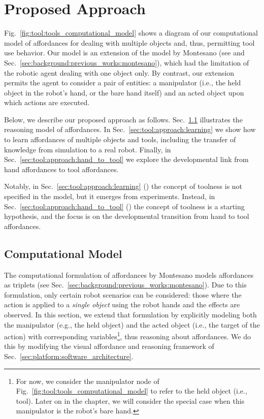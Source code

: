\section{Proposed Approach}
\label{sec:tool:approach}

Fig.~\ref{fig:tool:tools_computational_model} shows a diagram of our computational model of affordances for dealing with multiple objects and, thus, permitting tool use behavior.
Our model is an extension of the model by Montesano (see \cite{montesano:2008} and Sec.~\ref{sec:background:previous_works:montesano}), which had the limitation of the robotic agent dealing with one object only.
By contrast, our extension permits the agent to consider a pair of entities: a manipulator (i.e., the held object in the robot's hand, or the bare hand itself) and an acted object upon which actions are executed.

Below, we describe our proposed approach as follows.
Sec.~\ref{sec:tool:approach:model} illustrates the reasoning model of \intobj{} affordances.
In Sec.~\ref{sec:tool:approach:learning} we show how to learn affordances of multiple objects and tools, including the transfer of knowledge from simulation to a real robot.
Finally, in Sec.~\ref{sec:tool:approach:hand_to_tool} we explore the developmental link from hand affordances to tool affordances.

Notably, in Sec.~\ref{sec:tool:approach:learning} (\cite{goncalves:2014:icdl}) the concept of toolness is not specified in the model, but it emerges from experiments.
Instead, in Sec.~\ref{sec:tool:approach:hand_to_tool} (\cite{saponaro:2017:icdl}) the concept of toolness is a starting hypothesis, and the focus is on the developmental transition from hand to tool affordances.

\subsection{Computational Model}
\label{sec:tool:approach:model}

The computational formulation of affordances by Montesano \cite{montesano:2008} models affordances as \actobjeff{} triplets (see Sec.~\ref{sec:background:previous_works:montesano}).
Due to this formulation, only certain robot scenarios can be considered: those where the action is applied to a \emph{single object} using the robot hands and the effects are observed.
In this section, we extend that formulation by explicitly modeling both the manipulator (e.g., the held object) and the acted object (i.e., the target of the action) with corresponding variables\footnote{For now, we consider the manipulator node of Fig.~\ref{fig:tool:tools_computational_model} to refer to the held object (i.e., tool). Later on in the chapter, we will consider the special case when this manipulator is the robot's bare hand.}, thus reasoning about \emph{\intobj} affordances.
We do this by modifying the visual affordance and reasoning framework of Sec.~\ref{sec:platform:software_architecture}.

